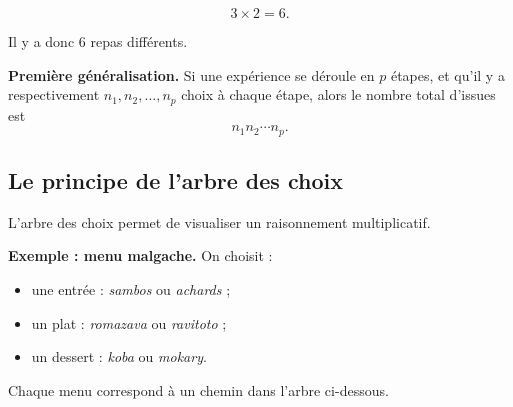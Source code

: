 \[
3\times 2=6.
\]

Il y a donc \(\boxed{6}\) repas différents.

\medskip

\noindent\textbf{Première généralisation.}
Si une expérience se déroule en \(p\) étapes, et qu’il y a respectivement
\(n_1,n_2,\dots,n_p\) choix à chaque étape, alors le nombre total d’issues est
\[
n_1n_2\cdots n_p.
\]

\subsection{Le principe de l’arbre des choix}

L’arbre des choix permet de visualiser un raisonnement multiplicatif.

\medskip

\noindent\textbf{Exemple : menu malgache.}
On choisit :
\begin{itemize}
    \item une entrée : \emph{sambos} ou \emph{achards} ;
    \item un plat : \emph{romazava} ou \emph{ravitoto} ;
    \item un dessert : \emph{koba} ou \emph{mokary}.
\end{itemize}

Chaque menu correspond à un chemin dans l’arbre ci-dessous.

\begin{center}
\end{center}

